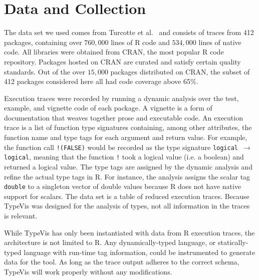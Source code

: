 \documentclass{vgtc}                          %
\newcommand{\typevis}{{\sc TypeVis}\xspace}
\begin{document}

\section{Data and Collection} \label{sec:data}

The data set we used comes from
Turcotte et al.~\cite{turcotte:2020}
and consists of traces from 412 packages,
containing over $760,000$ lines of R code
and $534,000$ lines of native code.
All libraries were obtained from CRAN,
the most popular R code repository.
Packages hosted on CRAN are curated and satisfy
certain quality standards.
Out of the over $15,000$ packages
distributed on CRAN,
the subset of 412 packages considered here
all had code coverage above 65\%.

Execution traces were recorded by running a dynamic analysis
over the test, example, and vignette code of each package.
A vignette is a form of documentation that weaves
together prose and executable code.
An execution trace is a list of function type signatures
containing, among other attributes, the function name
and type tags for each argument and return value.
For example, the function call {\tt !(FALSE)}
would be recorded as the type signature {\tt logical $\to$ logical},
meaning that the function {\tt !} took a logical value (i.e. a boolean)
and returned a logical value.
The type tags are assigned by the dynamic analysis
and refine the actual type tags in R.
For instance, the analysis
assigns the scalar tag {\tt double} to a singleton vector of double values
because R does not have native support for scalars.
The data set is a table of reduced execution traces.
Because \typevis was designed for the analysis of types,
not all information in the traces is relevant.

While \typevis has only been instantiated with
data from R execution traces, the architecture is not limited to R.
Any dynamically-typed language, %
or statically-typed language with run-time tag information,
could be instrumented to generate data for the tool.
As long as the trace output adheres to
the correct schema, \typevis will work properly without any modifications.

\end{document}
